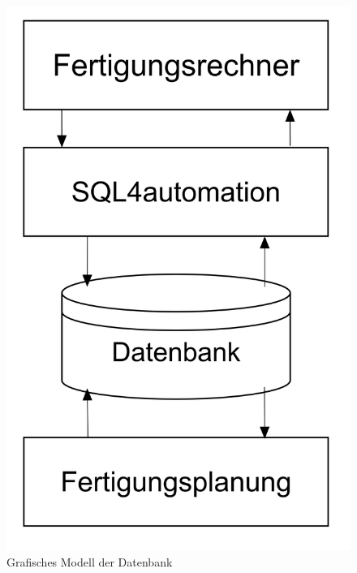 \begin{figure}[ht]
	    \centering
	    \includegraphics[width=0.4\linewidth]{Bilder/Datenbankdiagramm.png}
        \caption{Grafisches Modell der Datenbank}
        \label{fig:ER-Diagramm_Worbenche}
\end{figure}
 
